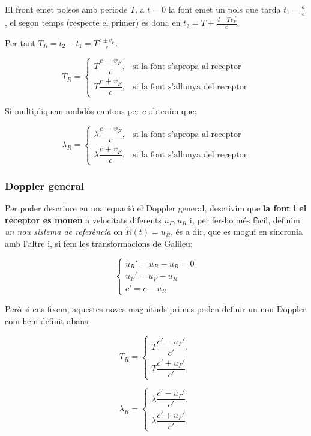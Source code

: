 \documentclass[12pt]{article}
\begin{document}
El front emet polsos amb periode $T$, a $t = 0$ la font emet un pols que tarda $t_1 = \frac{d}{c}$, el segon temps (respecte el primer) es dona en $t_2 = T + \frac{d - T\vec{v_F}}{c}$.

Per tant $T_R = t_2 - t_1 = T \frac{c \pm {v_F}}{c}$.

\[
\boxed{
T_R =
\begin{cases}
T\dfrac{c-{v_F}}{c}, & \text{si la font s'apropa al receptor}\\[8pt]
T\dfrac{c+{v_F}}{c}, & \text{si la font s'allunya del receptor}
\end{cases}
}
\]

\noindent\boxed{\lambda}

Si multipliquem ambdòs cantons per $c$ obtenim que;

\[\lambda_R =
\begin{cases}
\lambda\dfrac{c-{v_F}}{c}, & \text{si la font s'apropa al receptor}\\[8pt]
\lambda\dfrac{c+{v_F}}{c}, & \text{si la font s'allunya del receptor}
\end{cases}
\]

\subsubsection{Doppler general}

Per poder descriure en una equació el Doppler general, descrivim que \textbf{la font i el receptor es mouen} a velocitats diferents $u_F, u_R$ i, per fer-ho més fàcil, definim \textit{un nou sistema de referència} on $\dot{R}(t)= u_R$, és a dir, que es mogui en sincronia amb l'altre i, si fem les transformacions de Galileu:

\[\begin{cases}
  u_R' = u_R - u_R = 0\\
  u_F' = u_F - u_R\\
  c' = c - u_R
\end{cases}\]

Però si ens fixem, aquestes noves magnituds primes poden definir un nou Doppler com hem definit abans:

\[
T_R =
\begin{cases}
T\dfrac{c'-u_F'}{c'}, \\[8pt]
T\dfrac{c'+u_F'}{c'},
\end{cases}
\]

\[\lambda_R =
\begin{cases}
\lambda\dfrac{c'-u_F'}{c'}, \\[8pt]
\lambda\dfrac{c'+u_F'}{c'},
\end{cases}
\]
\end{document}
